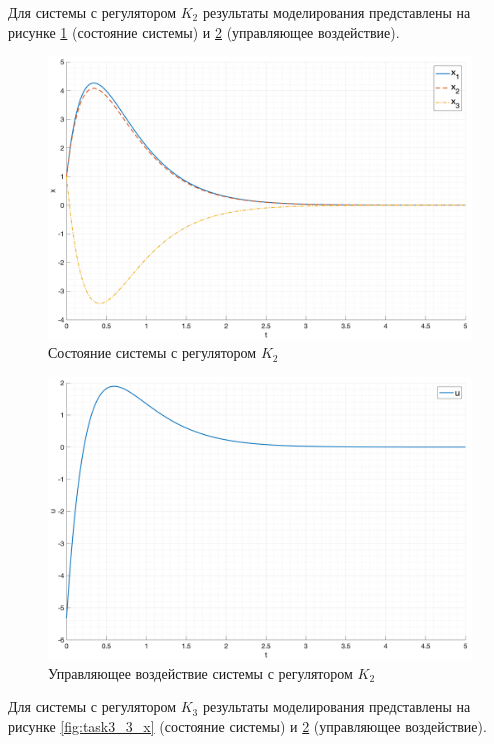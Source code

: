 Для системы с регулятором $K_2$ результаты моделирования представлены на рисунке \ref{fig:task3_2_x} 
(состояние системы) и \ref{fig:task3_2_u} (управляющее воздействие).

\begin{figure}[ht!]
    \centering
    \includegraphics[width=\textwidth]{media/plots/task3_2_x.png}
    \caption{Состояние системы с регулятором $K_2$}
    \label{fig:task3_2_x}
\end{figure}
\begin{figure}[ht!]
    \centering
    \includegraphics[width=\textwidth]{media/plots/task3_2_u.png}
    \caption{Управляющее воздействие системы с регулятором $K_2$}
    \label{fig:task3_2_u}
\end{figure}

Для системы с регулятором $K_3$ результаты моделирования представлены на рисунке \ref{fig:task3_3_x} 
(состояние системы) и \ref{fig:task3_2_u} (управляющее воздействие).

